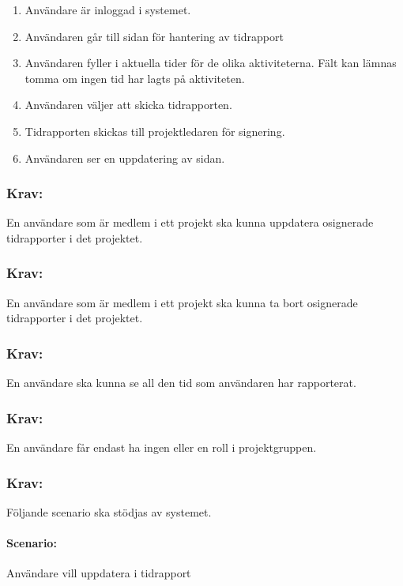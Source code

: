 \documentclass[paper=a4, fontsize=11pt,twoside]{article}
\begin{document}
 \begin{enumerate}
\item	Användare är inloggad i systemet.
\item 	Användaren går till sidan för hantering av tidrapport
\item 	Användaren fyller i aktuella tider för de olika aktiviteterna. Fält kan lämnas tomma om ingen tid har lagts på aktiviteten.
\item	Användaren väljer att skicka tidrapporten.
\item 	Tidrapporten skickas till projektledaren för signering.
 \item Användaren ser en uppdatering av sidan.
 	
 	
 \end{enumerate}
 
 \subsubsection*{Krav:} En användare som är medlem i ett projekt ska kunna uppdatera osignerade tidrapporter i det projektet.
 \subsubsection*{Krav:} En användare som är medlem i ett projekt ska kunna ta bort osignerade tidrapporter i det projektet.
\subsubsection*{Krav:}En användare ska kunna se all den tid som användaren har rapporterat.
\subsubsection*{Krav:}En användare får endast ha ingen eller en roll i projektgruppen.
\subsubsection*{Krav:} Följande scenario ska stödjas av systemet.
\paragraph{Scenario:}Användare vill uppdatera i tidrapport
\end{document}
